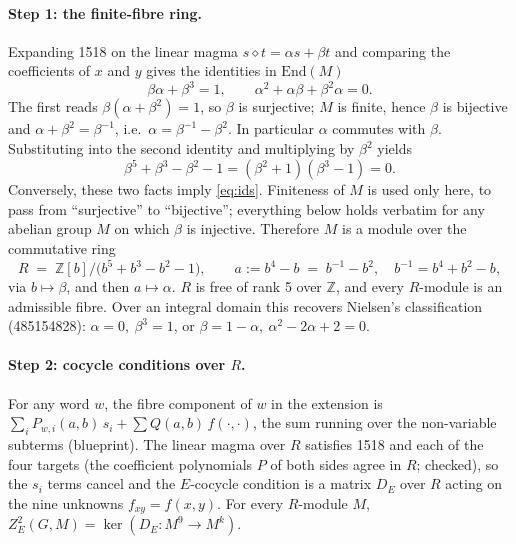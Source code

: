 \documentclass[11pt]{article}
\theoremstyle{remark}\newtheorem*{remark}{Remark}
\newcommand{\op}{\diamond}
\newcommand{\Z}{\mathbb{Z}}
\newcommand{\End}{\mathrm{End}}
\begin{document}
\paragraph{Step 1: the finite-fibre ring.}
Expanding 1518 on the linear magma $s\op t=\alpha s+\beta t$ and comparing the coefficients of $x$ and $y$ gives the identities in $\End(M)$
\begin{equation}\label{eq:ids}
\beta\alpha+\beta^{3}=1, \qquad \alpha^{2}+\alpha\beta+\beta^{2}\alpha=0 .
\end{equation}
The first reads $\beta(\alpha+\beta^{2})=1$, so $\beta$ is surjective; $M$ is finite, hence $\beta$ is bijective and $\alpha+\beta^{2}=\beta^{-1}$, i.e.\ $\alpha=\beta^{-1}-\beta^{2}$. In particular $\alpha$ commutes with $\beta$. Substituting into the second identity and multiplying by $\beta^{2}$ yields
\[
\beta^{5}+\beta^{3}-\beta^{2}-1 = (\beta^{2}+1)(\beta^{3}-1) = 0 .
\]
Conversely, these two facts imply \eqref{eq:ids}. Finiteness of $M$ is used only here, to pass from ``surjective'' to ``bijective''; everything below holds verbatim for any abelian group $M$ on which $\beta$ is injective. Therefore $M$ is a module over the commutative ring
\begin{equation}\label{eq:R}
R \;=\; \Z[b]\big/\bigl(b^{5}+b^{3}-b^{2}-1\bigr), \qquad a := b^{4}-b \;=\; b^{-1}-b^{2},\quad b^{-1}=b^{4}+b^{2}-b,
\end{equation}
via $b\mapsto\beta$, and then $a\mapsto\alpha$. $R$ is free of rank 5 over $\Z$, and every $R$-module is an admissible fibre. Over an integral domain this recovers Nielsen's classification (485154828): $\alpha=0,\ \beta^{3}=1$, or $\beta=1-\alpha,\ \alpha^{2}-2\alpha+2=0$.

\paragraph{Step 2: cocycle conditions over $R$.}
For any word $w$, the fibre component of $w$ in the extension is $\sum_i P_{w,i}(a,b)\,s_i+\sum Q(a,b)\,f(\cdot,\cdot)$, the sum running over the non-variable subterms (blueprint). The linear magma over $R$ satisfies 1518 and each of the four targets (the coefficient polynomials $P$ of both sides agree in $R$; checked), so the $s_i$ terms cancel and the $E$-cocycle condition is a matrix $D_E$ over $R$ acting on the nine unknowns $f_{xy}=f(x,y)$. For every $R$-module $M$, $Z^{2}_{E}(G,M)=\ker(D_E\colon M^{9}\to M^{k})$.
\end{document}
